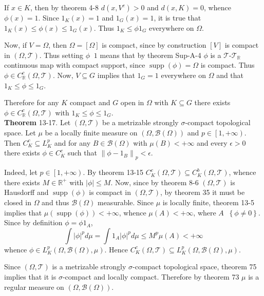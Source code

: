 \documentclass[a4paper]{article}
\newcommand{\obj}[1]{\left\{ #1 \right \}}
\newcommand{\clo}[1]{\left [ #1 \right ]}
\newcommand{\clop}[1]{\left [ #1 \right )}
\newcommand{\brac}[1]{\left ( #1 \right )}
\newcommand{\abs}[1]{\left | #1 \right |}
\newcommand{\nrm}[1]{\left\| #1 \right \|}
\newcommand{\Real}{\mathbb{R}}
\newcommand{\Tcal}{\mathcal{T}}
\newcommand{\borel}[1]{\mathcal{B}\brac{#1}}
\newcommand{\Supp}[1]{\operatorname{supp}\nolimits\brac{#1}}
\newcommand{\defn}{\mathop{\overset{\Delta}{=}}\nolimits}
\begin{document}
If $x\in K$, then by theorem 4-8 $d\brac{x,V^c}>0$ and $d\brac{x,K}=0$, whence $\phi\brac{x}=1$. Since $1_K\brac{x}=1$ and $1_G\brac{x}=1$, it is true that $1_K\brac{x} \leq \phi\brac{x} \leq 1_G\brac{x}$. Thus $1_K\leq \phi 1_G$ everywhere on $\Omega$.

Now, if $V=\Omega$, then $\Omega=\clo{\Omega}$ is compact, since by construction $\clo{V}$ is compact in $\brac{\Omega,\Tcal}$. Thus setting $\phi\defn 1$ means that by theorem Sup-A-4 $\phi$ is a $\Tcal$-$\Tcal_\Real$ continuous map with compact support, since $\Supp{\phi}=\Omega$ is compact. Thus $\phi\in C^c_\Real\brac{\Omega,\Tcal}$. Now, $V\subseteq G$ implies that $1_G=1$ everywhere on $\Omega$ and that $1_K\leq \phi \leq 1_G$.

Therefore for any $K$ compact and $G$ open in $\Omega$ with $K\subseteq G$ there exists $\phi\in C^c_\Real\brac{\Omega,\Tcal}$ with $1_K\leq \phi \leq 1_G$.\\

\label{thm:compact_support_indicator} \noindent\textbf{Theorem} 13-17.
Let $\brac{\Omega,\Tcal}$ be a metrizable strongly $\sigma$-compact topological space. Let $\mu$ be a locally finite measure on $\brac{\Omega,\borel{\Omega}}$ and $p\in \clop{1,+\infty}$. Then $C^c_K\subseteq L^p_K$ and 
for any $B\in \borel{\Omega}$ with $\mu\brac{B}<+\infty$ and every $\epsilon>0$ there exists $\phi\in C^c_K$ such that $\nrm{\phi-1_B}_p<\epsilon$.

Indeed, let $p\in\clop{1,+\infty}$. By theorem 13-15 $C^c_K\brac{\Omega,\Tcal}\subseteq C^b_K\brac{\Omega,\Tcal}$, whence there exists $M\in \Real^+$ with $\abs{\phi}\leq M$. Now, since by theorem 8-6 $\brac{\Omega,\Tcal}$ is Hausdorff and $\Supp{\phi}$ is compact in $\brac{\Omega,\Tcal}$, by theorem 35 it must be closed in $\Omega$ and thus $\borel{\Omega}$ measurable. Since $\mu$ is locally finite, theorem 13-5 implies that $\mu\brac{\Supp{\phi}}<+\infty$, whence $\mu\brac{A}<+\infty$, where $A\defn \obj{\phi\neq 0}$. Since by definition $\phi = \phi 1_A$, \[\int \abs{\phi}^p d\mu = \int 1_A \abs{\phi}^p d\mu \leq M^p \mu\brac{A} < +\infty\] whence $\phi\in L^p_K\brac{\Omega,\borel{\Omega},\mu}$. Hence $C^c_K\brac{\Omega,\Tcal}\subseteq L^p_K\brac{\Omega,\borel{\Omega},\mu}$.

Since $\brac{\Omega,\Tcal}$ is a metrizable strongly $\sigma$-compact topological space, theorem 75 implies that it is $\sigma$-compact and locally compact. Therefore by theorem 73 $\mu$ is a regular measure on $\brac{\Omega,\borel{\Omega}}$.
\end{document}
